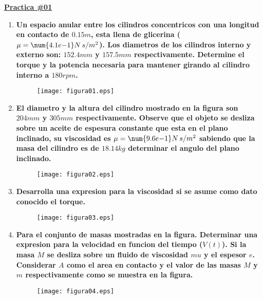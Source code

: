 \documentclass[letter,11pt]{article}
\begin{document}
\begin{center}
    {\large \bf{\underline{Practica \#01}}}
\end{center}
\vspace{0.25cm}

\begin{enumerate}
\item \textbf{Un espacio anular entre los cilindros concentricos con una
longitud en contacto de $0.15 m$, esta llena de glicerina
($\mu=\num{4.1e{-1}} N\,s/m^2$). Los diametros de los cilindros interno y
externo son: $152.4 mm$ y $157.5 mm$ respectivamente. Determine el torque y la
potencia necesaria para mantener girando al cilindro interno a $180 rpm$.}

\begin{figure}[!h]
\centering
\texttt{[image: figura01.eps]}
\end{figure}

\item \textbf{El diametro y la altura del cilindro mostrado en la figura son
$204 mm$ y $305 mm$ respectivamente. Observe que el objeto se desliza sobre un
aceite de espesura constante que esta en el plano inclinado, su viscosidad es
$\mu=\num{9.6e{-1}} N\,s/m^2$ sabiendo que la masa del cilindro es de $18.14 kg$
determinar el angulo del plano inclinado.}

\begin{figure}[!h]
\centering
\texttt{[image: figura02.eps]}
\end{figure}

\item \textbf{Desarrolla una expresion para la viscosidad si se asume como dato
conocido el torque.}

\begin{figure}[!h]
\centering
\texttt{[image: figura03.eps]}
\end{figure}

\item \textbf{Para el conjunto de masas mostradas en la figura. Determinar una
expresion para la velocidad en funcion del tiempo ($V(t)$). Si la masa $M$ se
desliza sobre un fluido de viscosidad $mu$ y el espesor $e$. Considerar $A$ como
el area en contacto y el valor de las masas $M$ y $m$ respectivamente como se
muestra en la figura.}

\begin{figure}[!h]
\centering
\texttt{[image: figura04.eps]}
\end{figure}

\end{enumerate}
\end{document}
